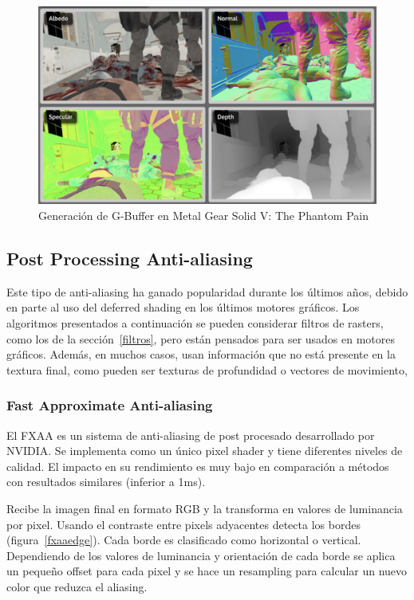\documentclass[withindex, glossary]{cam-thesis}
\begin{document}
\begin{figure}[!htbp]
    \includegraphics[width=\linewidth]{figures/gbuffer.png}
    \caption{Generación de G-Buffer en Metal Gear Solid V\@: The Phantom Pain\cite{analysismgsv}\label{gbuffer}}
\end{figure}

\subsection{Post Processing Anti-aliasing}

Este tipo de anti-aliasing ha ganado popularidad durante los últimos años, debido en parte al uso del deferred shading en los últimos motores gráficos. Los algoritmos presentados a continuación se pueden considerar filtros de rasters, como los de la sección~\ref{filtros}, pero están pensados para ser usados en motores gráficos. Además, en muchos casos, usan información que no está presente en la textura final, como pueden ser texturas de profundidad o vectores de movimiento,

\subsubsection{Fast Approximate Anti-aliasing}

El FXAA\cite{FXAA} es un sistema de anti-aliasing de post procesado desarrollado por NVIDIA\@. Se implementa como un único pixel shader y tiene diferentes niveles de calidad. El impacto en su rendimiento es muy bajo en comparación a métodos con resultados similares (inferior a 1ms).

Recibe la imagen final en formato RGB y la transforma en valores de luminancia por pixel. Usando el contraste entre pixels adyacentes detecta los bordes (figura~\ref{fxaaedge}). Cada borde es clasificado como horizontal o vertical. Dependiendo de los valores de luminancia y orientación de cada borde se aplica un pequeño offset para cada pixel y se hace un resampling para calcular un nuevo color que reduzca el aliasing\cite{FXAA}\cite{fxaa2}.
\end{document}

